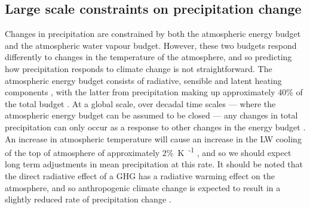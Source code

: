 
\subsection{Large scale constraints on precipitation change}

Changes in precipitation are constrained by both the atmospheric energy budget and the atmospheric water vapour budget.
However, these two budgets respond differently to changes in the temperature of the atmosphere, and so predicting how precipitation responds to climate change is not straightforward.
The atmospheric energy budget consists of radiative, sensible and latent heating components \citep{trenberth_earths_2009}, with the latter from precipitation making up approximately 40\% of the total budget \citep{rosenfeld_flood_2008}.
At a global scale, over decadal time scales --- where the atmospheric energy budget can be assumed to be closed --- any changes in total precipitation can only occur as a response to other changes in the energy budget \citep{allen_constraints_2002}.
An increase in atmospheric temperature will cause an increase in the LW cooling of the top of atmosphere of approximately 2\%\SI{}{\kelvin\textsuperscript{-1}} \citep{held_robust_2006}, and so we should expect long term adjustments in mean precipitation at this rate.
It should be noted that the direct radiative effect of a GHG has a radiative warming effect on the atmosphere, and so anthropogenic climate change is expected to result in a slightly reduced rate of precipitation change \citep{allen_constraints_2002}.

